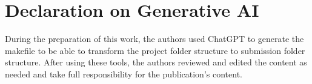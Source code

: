 \section{Declaration on Generative AI}
During the preparation of this work, the authors used ChatGPT to generate the makefile to be able to transform the
project folder structure to submission folder structure.
After using these tools, the authors reviewed and edited the content as needed and take full responsibility for the publication's content.
